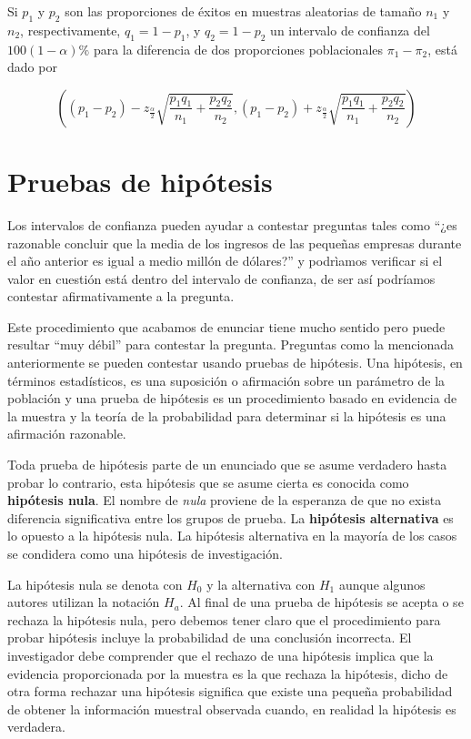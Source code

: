 \documentclass[letterpaper,]{book}
\begin{document}
Si \(p_1\) y \(p_2\) son las proporciones de éxitos en muestras aleatorias de tamaño \(n_1\) y \(n_2\), respectivamente, \(q_1 = 1- p_1\), y \(q_2 = 1- p_2\) un intervalo de confianza del \(100\left(1- \alpha \right)\%\) para la diferencia de dos proporciones poblacionales \(\pi_1-\pi_2\), está dado por

\begin{equation} 
\left( \left( p_1 - p_2 \right) - z_{\frac{\alpha}{2}}\sqrt{\dfrac{p_1q_1}{n_1} + \dfrac{p_2q_2}{n_2}} , \left( p_1 - p_2 \right) + z_{\frac{\alpha}{2}}\sqrt{\dfrac{p_1q_1}{n_1} + \dfrac{p_2q_2}{n_2}}  \right)
\label{eq:icprop2}
\end{equation}

\hypertarget{ph}{%
\section{Pruebas de hipótesis}\label{ph}}

Los intervalos de confianza pueden ayudar a contestar preguntas tales como ``¿es razonable concluir que la media de los ingresos de las pequeñas empresas durante el año anterior es igual a medio millón de dólares?'' y podrìamos verificar si el valor en cuestión está dentro del intervalo de confianza, de ser así podríamos contestar afirmativamente a la pregunta.

Este procedimiento que acabamos de enunciar tiene mucho sentido pero puede resultar ``muy débil'' para contestar la pregunta. Preguntas como la mencionada anteriormente se pueden contestar usando pruebas de hipótesis. Una hipótesis, en términos estadísticos, es una suposición o afirmación sobre un parámetro de la población y una prueba de hipótesis es un procedimiento basado en evidencia de la muestra y la teoría de la probabilidad para determinar si la hipótesis es una afirmación razonable.

Toda prueba de hipótesis parte de un enunciado que se asume verdadero hasta probar lo contrario, esta hipótesis que se asume cierta es conocida como \textbf{hipótesis nula}. El nombre de \emph{nula} proviene de la esperanza de que no exista diferencia significativa entre los grupos de prueba. La \textbf{hipótesis alternativa} es lo opuesto a la hipótesis nula. La hipótesis alternativa en la mayoría de los casos se condidera como una hipótesis de investigación.

La hipótesis nula se denota con \(H_0\) y la alternativa con \(H_1\) aunque algunos autores utilizan la notación \(H_a\). Al final de una prueba de hipótesis se acepta o se rechaza la hipótesis nula, pero debemos tener claro que el procedimiento para probar hipótesis incluye la probabilidad de una conclusión incorrecta. El investigador debe comprender que el rechazo de una hipótesis implica que la evidencia proporcionada por la muestra es la que rechaza la hipótesis, dicho de otra forma rechazar una hipótesis significa que existe una pequeña probabilidad de obtener la información muestral observada cuando, en realidad la hipótesis es verdadera.
\end{document}
